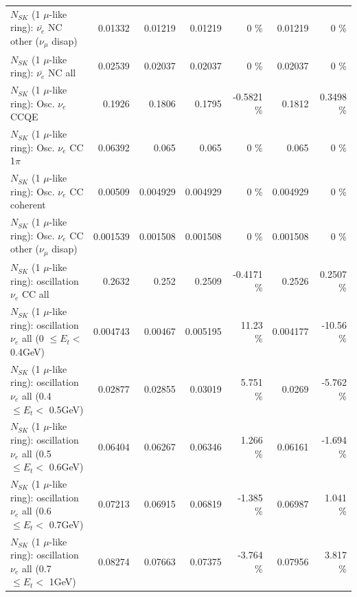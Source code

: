 \begin{table}
\begin{tabular}{| l | r | r | r  r | r  r |}
          $N_{SK}$ (1 $\mu$-like ring): $\bar{\nu_e}$ NC other ($\nu_\mu$ disap) &         0.01332 &         0.01219 &         0.01219 &        0 \%  &         0.01219 &        0 \%  \\ 
                            $N_{SK}$ (1 $\mu$-like ring): $\bar{\nu_{e}}$ NC all &         0.02539 &         0.02037 &         0.02037 &        0 \%  &         0.02037 &        0 \%  \\ 
\hline
\hline
\hline
                                 $N_{SK}$ (1 $\mu$-like ring): Osc. $\nu_e$ CCQE &          0.1926 &          0.1806 &          0.1795 &  -0.5821 \%  &          0.1812 &   0.3498 \%  \\ 
                            $N_{SK}$ (1 $\mu$-like ring): Osc. $\nu_e$ CC 1$\pi$ &         0.06392 &           0.065 &           0.065 &        0 \%  &           0.065 &        0 \%  \\ 
                          $N_{SK}$ (1 $\mu$-like ring): Osc. $\nu_e$ CC coherent &         0.00509 &        0.004929 &        0.004929 &        0 \%  &        0.004929 &        0 \%  \\ 
           $N_{SK}$ (1 $\mu$-like ring): Osc. $\nu_e$ CC other ($\nu_\mu$ disap) &        0.001539 &        0.001508 &        0.001508 &        0 \%  &        0.001508 &        0 \%  \\ 
                        $N_{SK}$ (1 $\mu$-like ring): oscillation $\nu_e$ CC all &          0.2632 &           0.252 &          0.2509 &  -0.4171 \%  &          0.2526 &   0.2507 \%  \\ 
\hline
$N_{SK}$ (1 $\mu$-like ring): oscillation $\nu_{e}$ all (0 $\leq E_{t} <$ 0.4GeV) &        0.004743 &         0.00467 &        0.005195 &    11.23 \%  &        0.004177 &   -10.56 \%  \\ 
$N_{SK}$ (1 $\mu$-like ring): oscillation $\nu_{e}$ all (0.4 $\leq E_{t} <$ 0.5GeV) &         0.02877 &         0.02855 &         0.03019 &    5.751 \%  &          0.0269 &   -5.762 \%  \\ 
$N_{SK}$ (1 $\mu$-like ring): oscillation $\nu_{e}$ all (0.5 $\leq E_{t} <$ 0.6GeV) &         0.06404 &         0.06267 &         0.06346 &    1.266 \%  &         0.06161 &   -1.694 \%  \\ 
$N_{SK}$ (1 $\mu$-like ring): oscillation $\nu_{e}$ all (0.6 $\leq E_{t} <$ 0.7GeV) &         0.07213 &         0.06915 &         0.06819 &   -1.385 \%  &         0.06987 &    1.041 \%  \\ 
$N_{SK}$ (1 $\mu$-like ring): oscillation $\nu_{e}$ all (0.7 $\leq E_{t} <$ 1GeV) &         0.08274 &         0.07663 &         0.07375 &   -3.764 \%  &         0.07956 &    3.817 \%  \\ 

\end{tabular}
\end{table}
